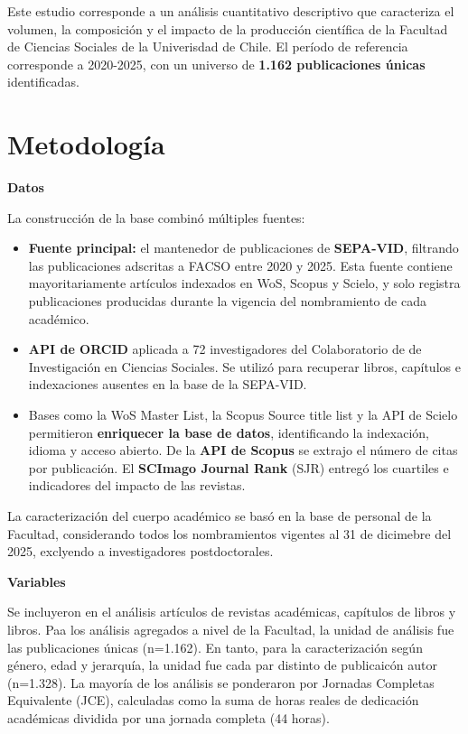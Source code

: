 \documentclass[
  a4paper,
  oneside]{scrbook}
\providecommand{\tightlist}{%
  \setlength{\itemsep}{0pt}\setlength{\parskip}{0pt}}\usepackage{longtable,booktabs,array}
\begin{document}
Este estudio corresponde a un análisis cuantitativo descriptivo que
caracteriza el volumen, la composición y el impacto de la producción
científica de la Facultad de Ciencias Sociales de la Univerisdad de
Chile. El período de referencia corresponde a 2020-2025, con un universo
de \textbf{1.162 publicaciones únicas} identificadas.

\section*{Metodología}\label{metodologuxeda}


\textbf{Datos}

La construcción de la base combinó múltiples fuentes:

\begin{itemize}
\tightlist
\item
  \textbf{Fuente principal:} el mantenedor de publicaciones de
  \textbf{SEPA-VID}, filtrando las publicaciones adscritas a FACSO entre
  2020 y 2025. Esta fuente contiene mayoritariamente artículos indexados
  en WoS, Scopus y Scielo, y solo registra publicaciones producidas
  durante la vigencia del nombramiento de cada académico.
\item
  \textbf{API de ORCID} aplicada a 72 investigadores del Colaboratorio
  de de Investigación en Ciencias Sociales. Se utilizó para recuperar
  libros, capítulos e indexaciones ausentes en la base de la SEPA-VID.
\item
  Bases como la WoS Master List, la Scopus Source title list y la API de
  Scielo permitieron \textbf{enriquecer la base de datos}, identificando
  la indexación, idioma y acceso abierto. De la \textbf{API de Scopus}
  se extrajo el número de citas por publicación. El \textbf{SCImago
  Journal Rank} (SJR) entregó los cuartiles e indicadores del impacto de
  las revistas.
\end{itemize}

La caracterización del cuerpo académico se basó en la base de personal
de la Facultad, considerando todos los nombramientos vigentes al 31 de
dicimebre del 2025, exclyendo a investigadores postdoctorales.

\textbf{Variables}

Se incluyeron en el análisis artículos de revistas académicas, capítulos
de libros y libros. Paa los análisis agregados a nivel de la Facultad,
la unidad de análisis fue las publicaciones únicas (n=1.162). En tanto,
para la caracterización según género, edad y jerarquía, la unidad fue
cada par distinto de publicaicón autor (n=1.328). La mayoría de los
análisis se ponderaron por Jornadas Completas Equivalente (JCE),
calculadas como la suma de horas reales de dedicación académicas
dividida por una jornada completa (44 horas).
\end{document}
